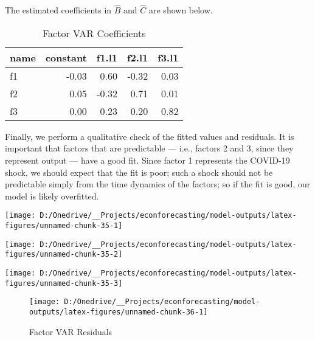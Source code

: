 \documentclass[11pt, letterpaper]{article}\usepackage[]{graphicx}\usepackage[]{color}
\begin{document}
The estimated coefficients in $\widehat{B}$ and $\widehat{C}$ are shown below.
\begin{table}[H]
\centering
\begingroup\footnotesize
\begin{tabular}{lrrrr}
  \hline
name & constant & f1.l1 & f2.l1 & f3.l1 \\ 
  \hline
f1 & -0.03 & 0.60 & -0.32 & 0.03 \\ 
  f2 & 0.05 & -0.32 & 0.71 & 0.01 \\ 
  f3 & 0.00 & 0.23 & 0.20 & 0.82 \\ 
   \hline
\end{tabular}
\endgroup
\caption{Factor VAR Coefficients} 
\end{table}



Finally, we perform a qualitative check of the fitted values and residuals. It is important that factors that are predictable --- i.e., factors 2 and 3, since they represent output --- have a good fit. Since factor 1 represents the COVID-19 shock, we should expect that the fit is poor; such a shock should not be predictable simply from the time dynamics of the factors; so if the fit is good, our model is likely overfitted.


{\centering \texttt{[image: D:/Onedrive/\_\_Projects/econforecasting/model-outputs/latex-figures/unnamed-chunk-35-1]} 

}




{\centering \texttt{[image: D:/Onedrive/\_\_Projects/econforecasting/model-outputs/latex-figures/unnamed-chunk-35-2]} 

}




{\centering \texttt{[image: D:/Onedrive/\_\_Projects/econforecasting/model-outputs/latex-figures/unnamed-chunk-35-3]} 

}





\begin{figure}[H]

{\centering \texttt{[image: D:/Onedrive/\_\_Projects/econforecasting/model-outputs/latex-figures/unnamed-chunk-36-1]} 

}

\caption[Factor VAR Residuals]{Factor VAR Residuals}\label{fig:unnamed-chunk-36}
\end{figure}
\end{document}

